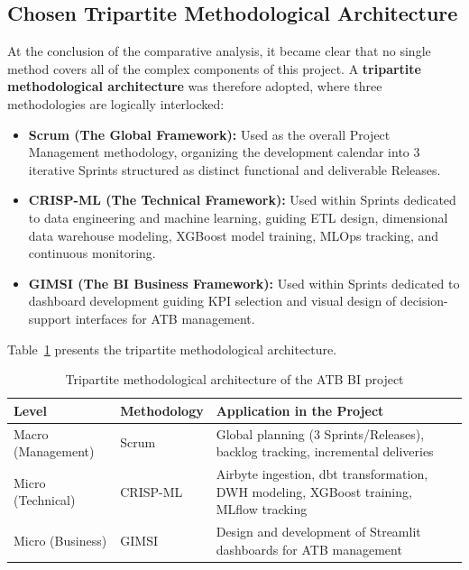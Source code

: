 \subsection{Chosen Tripartite Methodological Architecture}

At the conclusion of the comparative analysis, it became clear that no single method covers
all of the complex components of this project. A \textbf{tripartite methodological
architecture} was therefore adopted, where three methodologies are logically interlocked:

\begin{itemize}
    \item \textbf{Scrum (The Global Framework):} Used as the overall Project Management
    methodology, organizing the development calendar into 3 iterative Sprints structured as
    distinct functional and deliverable Releases.

    \item \textbf{CRISP-ML (The Technical Framework):} Used within Sprints dedicated to
    data engineering and machine learning, guiding ETL design, dimensional data warehouse
    modeling, XGBoost model training, MLOps tracking, and continuous monitoring.

    \item \textbf{GIMSI (The BI Business Framework):} Used within Sprints dedicated to
    dashboard development guiding KPI selection and visual design of decision-support
    interfaces for ATB management.
\end{itemize}

Table~\ref{tab:methodologie_tripartite} presents the tripartite methodological architecture.

\begin{table}[H]
\small
\centering
\caption{Tripartite methodological architecture of the ATB BI project}
\label{tab:methodologie_tripartite}
\begin{tabular}{|p{3cm}|p{4.5cm}|p{6.5cm}|}
\hline
\rowcolor{blue!15}
\textbf{Level} & \textbf{Methodology} & \textbf{Application in the Project} \\
\hline
Macro (Management) & Scrum & Global planning (3 Sprints/Releases), backlog tracking, incremental deliveries \\
\hline
Micro (Technical) & CRISP-ML & Airbyte ingestion, dbt transformation, DWH modeling, XGBoost training, MLflow tracking \\
\hline
Micro (Business) & GIMSI & Design and development of Streamlit dashboards for ATB management \\
\hline
\end{tabular}
\end{table}

